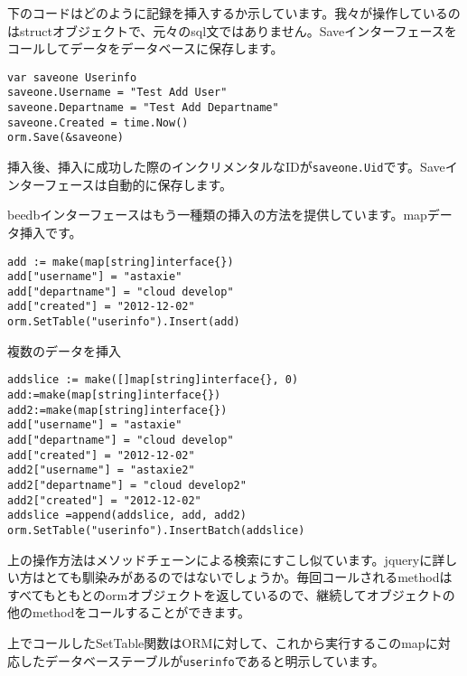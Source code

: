 下のコードはどのように記録を挿入するか示しています。我々が操作しているのはstructオブジェクトで、元々のsql文ではありません。Saveインターフェースをコールしてデータをデータベースに保存します。

\begin{lstlisting}[numbers=none]
var saveone Userinfo
saveone.Username = "Test Add User"
saveone.Departname = "Test Add Departname"
saveone.Created = time.Now()
orm.Save(&saveone)
\end{lstlisting}

挿入後、挿入に成功した際のインクリメンタルなIDが\texttt{saveone.Uid}です。Saveインターフェースは自動的に保存します。

beedbインターフェースはもう一種類の挿入の方法を提供しています。mapデータ挿入です。

\begin{lstlisting}[numbers=none]
add := make(map[string]interface{})
add["username"] = "astaxie"
add["departname"] = "cloud develop"
add["created"] = "2012-12-02"
orm.SetTable("userinfo").Insert(add)
\end{lstlisting}

複数のデータを挿入

\begin{lstlisting}[numbers=none]
addslice := make([]map[string]interface{}, 0)
add:=make(map[string]interface{})
add2:=make(map[string]interface{})
add["username"] = "astaxie"
add["departname"] = "cloud develop"
add["created"] = "2012-12-02"
add2["username"] = "astaxie2"
add2["departname"] = "cloud develop2"
add2["created"] = "2012-12-02"
addslice =append(addslice, add, add2)
orm.SetTable("userinfo").InsertBatch(addslice)
\end{lstlisting}

上の操作方法はメソッドチェーンによる検索にすこし似ています。jqueryに詳しい方はとても馴染みがあるのではないでしょうか。毎回コールされるmethodはすべてもともとのormオブジェクトを返しているので、継続してオブジェクトの他のmethodをコールすることができます。

上でコールしたSetTable関数はORMに対して、これから実行するこのmapに対応したデータベーステーブルが\texttt{userinfo}であると明示しています。
